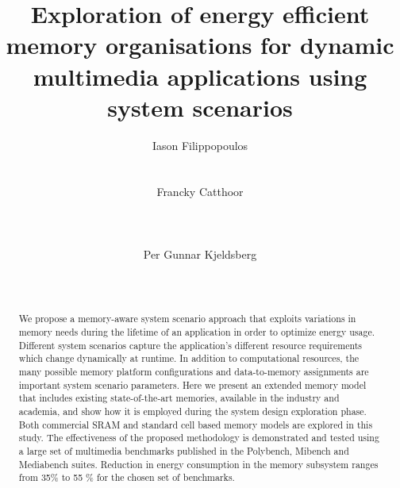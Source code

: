 \documentclass{acm_proc_article-sp}
\begin{document}
\title{Exploration of energy efficient memory organisations for dynamic multimedia applications using system scenarios}

\author{
\alignauthor
Iason Filippopoulos\\
		\\
       \\
\alignauthor
Francky Catthoor\\
       \\
       \\
       \\
\alignauthor     
Per Gunnar Kjeldsberg\\
		\\
       \\
}       

\maketitle

\begin{abstract}
We propose a memory-aware system scenario approach that exploits variations in memory needs during the lifetime of an application in order to optimize energy usage. Different system scenarios capture the application's different resource requirements which change dynamically at runtime. In addition to computational resources, the many possible memory platform configurations and data-to-memory assignments are important system scenario parameters. Here we present an extended memory model that includes existing state-of-the-art memories, available in the industry and academia, and show how it is employed during the system design exploration phase. Both commercial SRAM and standard cell based memory models are explored in this study. The effectiveness of the proposed methodology is demonstrated and tested using a large set of multimedia benchmarks published in the Polybench, Mibench and Mediabench suites. Reduction in energy consumption in the memory subsystem ranges from 35\% to 55 \% for the chosen set of benchmarks.
\end{abstract}
\end{document}
